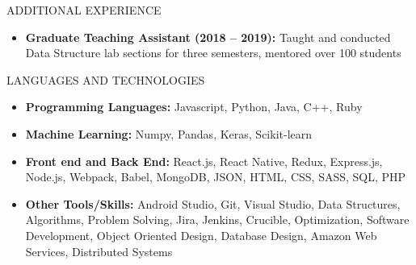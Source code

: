 \documentclass[]{mcdowellcv}
\begin{document}
	\begin{cvsection}{ADDITIONAL EXPERIENCE}
		\begin{cvsubsection}{}{}{}	
			\begin{itemize}
				\item \textbf{Graduate Teaching Assistant (2018 – 2019):} Taught and conducted Data Structure lab sections for three semesters, mentored over 100 students
			\end{itemize}
		\end{cvsubsection}
	\end{cvsection}
	
	\begin{cvsection}{LANGUAGES AND TECHNOLOGIES}
		\begin{cvsubsection}{}{}{}	
			\begin{itemize}
				\item \textbf{Programming Languages:} Javascript, Python, Java, C++, Ruby
				\item \textbf{Machine Learning:} Numpy, Pandas, Keras, Scikit-learn
				\item \textbf{Front end and Back End:} React.js, React Native, Redux, Express.js, Node.js, Webpack, Babel, MongoDB, JSON, HTML, CSS, SASS, SQL, PHP
				\item \textbf{Other Tools/Skills:} Android Studio, Git, Visual Studio, Data Structures, Algorithms, Problem Solving, Jira, Jenkins, Crucible, Optimization, Software Development, Object Oriented Design, Database Design, Amazon Web Services, Distributed Systems
			\end{itemize}
		\end{cvsubsection}
	\end{cvsection}
	
\end{document}
